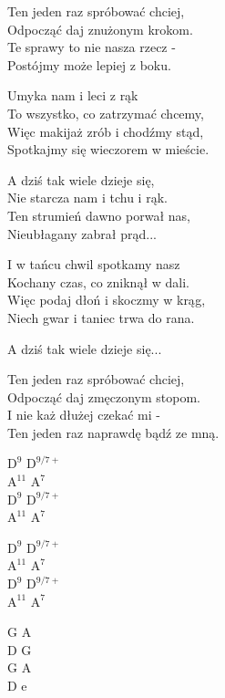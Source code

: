 \begin{text}
    Ten jeden raz spróbować chciej,\\
    Odpocząć daj znużonym krokom.\\
    Te sprawy to nie nasza rzecz -\\
    Postójmy może lepiej z boku.

    Umyka nam i leci z rąk\\
    To wszystko, co zatrzymać chcemy,\\
    Więc makijaż zrób i chodźmy stąd,\\
    Spotkajmy się wieczorem w mieście.

    A dziś tak wiele dzieje się,\\
    Nie starcza nam i tchu i rąk.\\
    Ten strumień dawno porwał nas,\\
    Nieubłagany zabrał prąd...

    I w tańcu chwil spotkamy nasz\\
    Kochany czas, co zniknął w dali.\\
    Więc podaj dłoń i skoczmy w krąg,\\
    Niech gwar i taniec trwa do rana.

    A dziś tak wiele dzieje się...

    Ten jeden raz spróbować chciej,\\
    Odpocząć daj zmęczonym stopom.\\
    I nie każ dłużej czekać mi -\\
    Ten jeden raz naprawdę bądź ze mną.
\end{text}
\begin{chord}
    $\mathrm{D^9}$ $\mathrm{D^{9/7+}}$\\
    $\mathrm{A^{11}}$ $\mathrm{A^7}$\\
    $\mathrm{D^9}$ $\mathrm{D^{9/7+}}$\\
    $\mathrm{A^{11}}$ $\mathrm{A^7}$

    $\mathrm{D^9}$ $\mathrm{D^{9/7+}}$\\
    $\mathrm{A^{11}}$ $\mathrm{A^7}$\\
    $\mathrm{D^9}$ $\mathrm{D^{9/7+}}$\\
    $\mathrm{A^{11}}$ $\mathrm{A^7}$

    G A\\
    D G\\
    G A\\
    D e
\end{chord}
